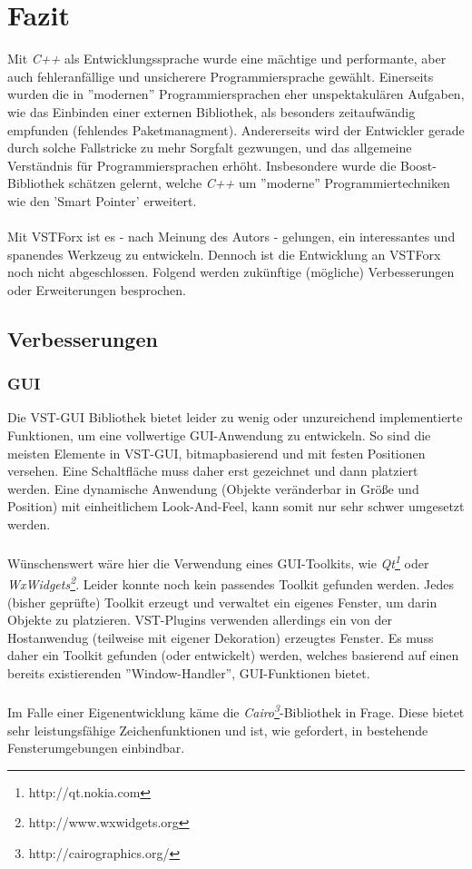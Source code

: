 \section{Fazit}
Mit \emph{C++} als Entwicklungssprache wurde eine mächtige und performante, aber auch fehleranfällige und unsicherere Programmiersprache gewählt. Einerseits wurden die in ''modernen'' Programmiersprachen eher unspektakulären Aufgaben, wie das Einbinden einer externen Bibliothek, als besonders zeitaufwändig empfunden (fehlendes Paketmanagment). Andererseits wird der Entwickler gerade durch solche Fallstricke zu mehr Sorgfalt gezwungen, und das allgemeine Verständnis für Programmiersprachen erhöht. 
Insbesondere wurde die Boost-Bibliothek schätzen gelernt, welche \emph{C++} um ''moderne'' Programmiertechniken wie den 'Smart Pointer' erweitert. 
\\\\
Mit VSTForx ist es - nach Meinung des Autors - gelungen, ein interessantes und spanendes Werkzeug zu entwickeln. Dennoch ist die Entwicklung an VSTForx noch nicht abgeschlossen. Folgend werden zukünftige (mögliche) Verbesserungen oder Erweiterungen besprochen. 
\subsection{Verbesserungen}
\subsubsection{GUI}
Die VST-GUI Bibliothek bietet leider zu wenig oder unzureichend implementierte Funktionen, um eine vollwertige GUI-Anwendung zu entwickeln. So sind die meisten Elemente in VST-GUI, bitmapbasierend und mit festen Positionen versehen. Eine Schaltfläche muss daher erst gezeichnet und dann platziert werden. Eine dynamische Anwendung (Objekte veränderbar in Größe und Position) mit einheitlichem Look-And-Feel, kann somit nur sehr schwer umgesetzt werden. 
\\\\
Wünschenswert wäre hier die Verwendung eines GUI-Toolkits, wie \emph{Qt\footnote{http://qt.nokia.com}} oder \emph{WxWidgets\footnote{http://www.wxwidgets.org}}. Leider konnte  noch kein passendes Toolkit gefunden werden. Jedes (bisher geprüfte) Toolkit erzeugt und verwaltet ein eigenes Fenster, um darin Objekte zu platzieren. VST-Plugins verwenden allerdings ein von der Hostanwendug (teilweise mit eigener Dekoration) erzeugtes Fenster. Es muss daher ein Toolkit gefunden (oder entwickelt) werden, welches basierend auf einen bereits existierenden ''Window-Handler'', GUI-Funktionen bietet.
\\\\
Im Falle einer Eigenentwicklung käme die \emph{Cairo\footnote{http://cairographics.org/}}-Bibliothek in Frage. Diese bietet sehr leistungsfähige Zeichenfunktionen und ist, wie gefordert, in bestehende Fensterumgebungen einbindbar.
